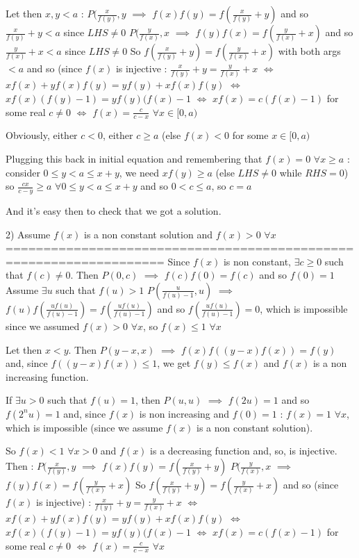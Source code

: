 \begin{solution}
Let then $ x,y<a$ :
$ P(\frac x{f(y)},y$ $ \implies$ $ f(x)f(y)=f(\frac x{f(y)}+y)$ and so $ \frac x{f(y)}+y<a$ since $ LHS\ne 0$
$ P(\frac y{f(x)},x$ $ \implies$ $ f(y)f(x)=f(\frac y{f(x)}+x)$ and so $ \frac y{f(x)}+x<a$ since $ LHS\ne 0$
So $ f(\frac x{f(y)}+y)=f(\frac y{f(x)}+x)$ with both args $ <a$ and so (since $ f(x)$ is injective :
$ \frac x{f(y)}+y=\frac y{f(x)}+x$
$ \iff$ $ xf(x)+yf(x)f(y)=yf(y)+xf(x)f(y)$
$ \iff$ $ xf(x)(f(y)-1)=yf(y)(f(x)-1$
$ \iff$ $ xf(x)=c(f(x)-1)$ for some real $ c\ne 0$
$ \iff$ $ f(x)=\frac c{c-x}$ $ \forall x\in[0,a)$

Obviously, either $ c<0$, either $ c\ge a$ (else $ f(x)<0$ for some $ x\in[0,a)$

Plugging this back in initial equation and remembering that $ f(x)=0$ $ \forall x\ge a$ :
consider $ 0\le y< a\le x+y$, we need $ xf(y)\ge a$ (else $ LHS\ne 0$ while $ RHS= 0$) so $ \frac {cx}{c-y}\ge a$ $ \forall 0\le y< a\le x+y$ and so $ 0<c\le a$, so $ c=a$

And it's easy then to check that we got a solution.

2) Assume $ f(x)$ is a non constant solution and $ f(x)>0$ $ \forall x$
===================================================================
Since $ f(x)$ is non constant, $ \exists c\geq 0$ such that $ f(c)\ne 0$. Then $ P(0,c)$ $ \implies$ $ f(c)f(0)=f(c)$ and so $ f(0)=1$
Assume $ \exists u$ such that $ f(u)>1$
$ P(\frac u{f(u)-1},u)$ $ \implies$ $ f(u)f(\frac {uf(u)}{f(u)-1})=f(\frac {uf(u)}{f(u)-1})$ and so $ f(\frac {uf(u)}{f(u)-1})=0$, which is impossible since we assumed $ f(x)>0$ $ \forall x$, so $ f(x)\le 1$ $ \forall x$

Let then $ x<y$. Then $ P(y-x,x)$ $ \implies$ $ f(x)f((y-x)f(x))=f(y)$ and, since $ f((y-x)f(x))\le 1$, we get $ f(y)\le f(x)$ and $ f(x)$ is a non increasing function.

If $ \exists u>0$ such that $ f(u)=1$, then $ P(u,u)$ $ \implies$ $ f(2u)=1$ and so $ f(2^nu)=1$ and, since $ f(x)$ is non increasing and $ f(0)=1$ : $ f(x)=1$ $ \forall x$, which is impossible (since we assume $ f(x)$ is a non constant solution).

So $ f(x)<1$ $ \forall x>0$ and $ f(x)$ is a decreasing function and, so, is injective.
Then :
$ P(\frac x{f(y)},y$ $ \implies$ $ f(x)f(y)=f(\frac x{f(y)}+y)$ 
$ P(\frac y{f(x)},x$ $ \implies$ $ f(y)f(x)=f(\frac y{f(x)}+x)$ 
So $ f(\frac x{f(y)}+y)=f(\frac y{f(x)}+x)$ and so (since $ f(x)$ is injective) :
$ \frac x{f(y)}+y=\frac y{f(x)}+x$
$ \iff$ $ xf(x)+yf(x)f(y)=yf(y)+xf(x)f(y)$
$ \iff$ $ xf(x)(f(y)-1)=yf(y)(f(x)-1$
$ \iff$ $ xf(x)=c(f(x)-1)$ for some real $ c\ne 0$
$ \iff$ $ f(x)=\frac c{c-x}$ $ \forall x$


\end{solution}
